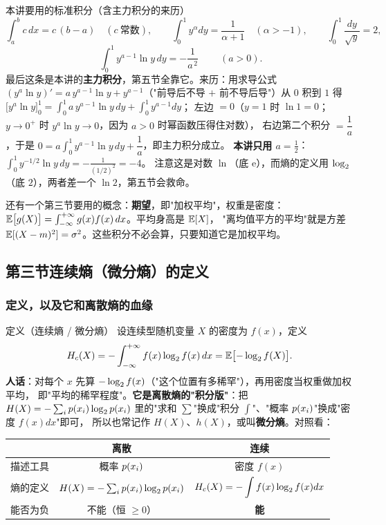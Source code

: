 \begin{defbox}{本讲要用的标准积分（含主力积分的来历）}
\[
\int_a^b c\,dx=c\,(b-a)\quad(c\ \text{常数}),
\qquad
\int_0^1y^{\alpha}dy=\frac{1}{\alpha+1}\quad(\alpha>-1),
\qquad
\int_0^1\frac{dy}{\sqrt y}=2 ,
\]
\[
\boxed{\ \int_0^1 y^{a-1}\ln y\,dy=-\frac{1}{a^{\,2}}\ }\qquad(a>0).
\]
最后这条是本讲的\textbf{主力积分}，第五节全靠它。来历：用求导公式
$(y^{a}\ln y)'=a\,y^{a-1}\ln y+y^{a-1}$（"前导后不导 $+$ 前不导后导"）从 $0$ 积到 $1$ 得
$\bigl[y^{a}\ln y\bigr]_{0}^{1}=\int_0^1a\,y^{a-1}\ln y\,dy+\int_0^1y^{a-1}dy$；
左边 $=0$（$y=1$ 时 $\ln1=0$；$y\to0^+$ 时 $y^{a}\ln y\to0$，因为 $a>0$ 时幂函数压得住对数），
右边第二个积分 $=\dfrac1a$，于是 $0=a\int_0^1y^{a-1}\ln y\,dy+\dfrac1a$，即主力积分成立。
\textbf{本讲只用 $a=\tfrac12$}：$\int_0^1y^{-1/2}\ln y\,dy=-\frac{1}{(1/2)^2}=-4$。
注意这是对数 $\ln$（底 $\mathrm{e}$），而熵的定义用 $\log_{2}$（底 $2$），两者差一个 $\ln2$，第五节会救命。
\end{defbox}

还有一个第三节要用的概念：\textbf{期望}，即"加权平均"，权重是密度：
$\operatorname{\mathbb{E}}\bigl[g(X)\bigr]=\int_{-\infty}^{+\infty}g(x)f(x)\,dx$。平均身高是 $\operatorname{\mathbb{E}}[X]$，
"离均值平方的平均"就是方差 $\operatorname{\mathbb{E}}[(X-m)^2]=\sigma^2$。这些积分不必会算，只要知道它是加权平均。

\subsection{第三节\quad 连续熵（微分熵）的定义}

\subsubsection{定义，以及它和离散熵的血缘}

\begin{defbox}{定义（连续熵 / 微分熵）}
设连续型随机变量 $X$ 的密度为 $f(x)$，定义
\[
H_{c}\!\left(X\right)=-\int_{-\infty}^{+\infty}f(x)\log_{2} f(x)\,dx=\operatorname{\mathbb{E}}\bigl[-\log_{2} f(X)\bigr].
\]
\textbf{人话}：对每个 $x$ 先算 $-\log_{2} f(x)$（"这个位置有多稀罕"），再用密度当权重做加权平均，
即"平均的稀罕程度"。\textbf{它是离散熵的"积分版"}：把 $H\!\left(X\right)=-\sum_ip\!\left(x_i\right)\log_{2}p\!\left(x_i\right)$
里的"求和 $\sum$"换成"积分 $\int$"、"概率 $p\!\left(x_i\right)$"换成"密度 $f(x)dx$"即可，
所以也常记作 $H(X)$、$h(X)$，或叫\textbf{微分熵}。对照看：
\end{defbox}

\begin{center}
\small
\begin{tabular}{@{}l c c@{}}
\toprule
 & 离散 & 连续 \\
\midrule
描述工具 & 概率 $p\!\left(x_i\right)$ & 密度 $f(x)$ \\
熵的定义 & $H\!\left(X\right)=-\sum_ip\!\left(x_i\right)\log_{2}p\!\left(x_i\right)$ & $H_{c}\!\left(X\right)=-\displaystyle\int f(x)\log_{2} f(x)dx$ \\
能否为负 & 不能（恒 $\ge0$） & \textbf{能} \\
\bottomrule
\end{tabular}
\end{center}

